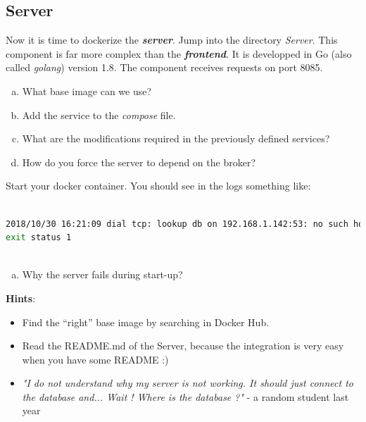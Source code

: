 \documentclass[a4paper,11pt]{exam}
\begin{document}
\subsection{Server}
	\begin{questions}

	\question Now it is time to dockerize the \textit{\textbf{server}}. Jump into the directory \textit{Server}. This component is far more complex than the \textit{\textbf{frontend}}. It is developped in Go (also called \textit{golang}) version 1.8. The component receives requests on port 8085.
	
	\begin{enumerate}[(a)] %
		\item What base image can we use?
		\item Add the service to the \textit{compose} file.
		\item What are the modifications required in the previously defined services?
		\item How do you force the server to depend on the broker?
	\end{enumerate}
	Start your docker container. You should see in the logs something like: 
	\begin{lstlisting}[frame=single,language={sh}]  % Start your code-block
	
2018/10/30 16:21:09 dial tcp: lookup db on 192.168.1.142:53: no such host
exit status 1
		
	\end{lstlisting}
	\begin{enumerate}[(e)]
		\item Why the server fails during start-up?
	\end{enumerate}
	
	\textbf{Hints}:
	\begin{itemize}
		\item Find the ``right'' base image by searching in Docker Hub.
		\item Read the README.md of the Server, because the integration is very easy when you have some README :)
		\item \textit{"I do not understand why my server is not working. It should just connect to the database and... Wait ! Where is the database ?"} - a random student last year
	\end{itemize}
	\end{questions}
\end{document}
